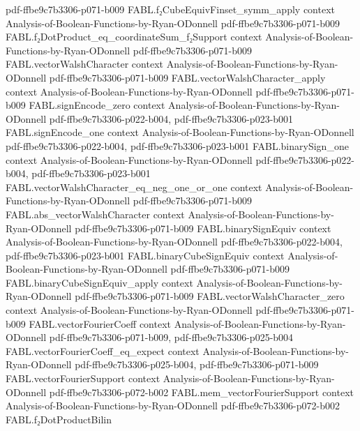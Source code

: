 \begin{theorem}
  {pdf-ffbe9c7b3306-p071-b009}
\proofstep
  {FABL.f₂CubeEquivFinset_symm_apply}
  {context}
  {Analysis-of-Boolean-Functions-by-Ryan-ODonnell}
  {pdf-ffbe9c7b3306-p071-b009}
\proofstep
  {FABL.f₂DotProduct_eq_coordinateSum_f₂Support}
  {context}
  {Analysis-of-Boolean-Functions-by-Ryan-ODonnell}
  {pdf-ffbe9c7b3306-p071-b009}
\proofstep
  {FABL.vectorWalshCharacter}
  {context}
  {Analysis-of-Boolean-Functions-by-Ryan-ODonnell}
  {pdf-ffbe9c7b3306-p071-b009}
\proofstep
  {FABL.vectorWalshCharacter_apply}
  {context}
  {Analysis-of-Boolean-Functions-by-Ryan-ODonnell}
  {pdf-ffbe9c7b3306-p071-b009}
\proofstep
  {FABL.signEncode_zero}
  {context}
  {Analysis-of-Boolean-Functions-by-Ryan-ODonnell}
  {pdf-ffbe9c7b3306-p022-b004,
    pdf-ffbe9c7b3306-p023-b001}
\proofstep
  {FABL.signEncode_one}
  {context}
  {Analysis-of-Boolean-Functions-by-Ryan-ODonnell}
  {pdf-ffbe9c7b3306-p022-b004,
    pdf-ffbe9c7b3306-p023-b001}
\proofstep
  {FABL.binarySign_one}
  {context}
  {Analysis-of-Boolean-Functions-by-Ryan-ODonnell}
  {pdf-ffbe9c7b3306-p022-b004,
    pdf-ffbe9c7b3306-p023-b001}
\proofstep
  {FABL.vectorWalshCharacter_eq_neg_one_or_one}
  {context}
  {Analysis-of-Boolean-Functions-by-Ryan-ODonnell}
  {pdf-ffbe9c7b3306-p071-b009}
\proofstep
  {FABL.abs_vectorWalshCharacter}
  {context}
  {Analysis-of-Boolean-Functions-by-Ryan-ODonnell}
  {pdf-ffbe9c7b3306-p071-b009}
\proofstep
  {FABL.binarySignEquiv}
  {context}
  {Analysis-of-Boolean-Functions-by-Ryan-ODonnell}
  {pdf-ffbe9c7b3306-p022-b004,
    pdf-ffbe9c7b3306-p023-b001}
\proofstep
  {FABL.binaryCubeSignEquiv}
  {context}
  {Analysis-of-Boolean-Functions-by-Ryan-ODonnell}
  {pdf-ffbe9c7b3306-p071-b009}
\proofstep
  {FABL.binaryCubeSignEquiv_apply}
  {context}
  {Analysis-of-Boolean-Functions-by-Ryan-ODonnell}
  {pdf-ffbe9c7b3306-p071-b009}
\proofstep
  {FABL.vectorWalshCharacter_zero}
  {context}
  {Analysis-of-Boolean-Functions-by-Ryan-ODonnell}
  {pdf-ffbe9c7b3306-p071-b009}
\proofstep
  {FABL.vectorFourierCoeff}
  {context}
  {Analysis-of-Boolean-Functions-by-Ryan-ODonnell}
  {pdf-ffbe9c7b3306-p071-b009,
    pdf-ffbe9c7b3306-p025-b004}
\proofstep
  {FABL.vectorFourierCoeff_eq_expect}
  {context}
  {Analysis-of-Boolean-Functions-by-Ryan-ODonnell}
  {pdf-ffbe9c7b3306-p025-b004,
    pdf-ffbe9c7b3306-p071-b009}
\proofstep
  {FABL.vectorFourierSupport}
  {context}
  {Analysis-of-Boolean-Functions-by-Ryan-ODonnell}
  {pdf-ffbe9c7b3306-p072-b002}
\proofstep
  {FABL.mem_vectorFourierSupport}
  {context}
  {Analysis-of-Boolean-Functions-by-Ryan-ODonnell}
  {pdf-ffbe9c7b3306-p072-b002}
\proofstep
  {FABL.f₂DotProductBilin}

\end{theorem}
